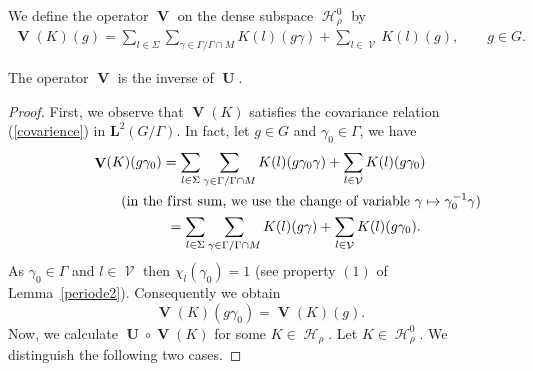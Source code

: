 \documentclass[pdftex]{sigma}
\DeclareMathOperator{\U}{\mathbf{U}}
\DeclareMathOperator{\V}{\mathbf{V}} \DeclareMathOperator{\Aut}{Aut}
\DeclareMathOperator{\nongen}{\mathcal{V}}
\DeclareMathOperator{\Hi}{\mathscr{H}}
\begin{document}
We def\/ine the  operator $\V$  on the dense subspace $ \Hi_\rho^0 $
by
\begin{gather*}
\V(K)(g) =  \sum_{l\in \Sigma} \sum_{\gamma\in \Gamma/\Gamma\cap
M} K(l)(g\gamma)+ \sum _{l\in \nongen} K(l)(g),\qquad g\in G.
\end{gather*}

\begin{proposition}
The operator $\V$ is the inverse of $\U$.
\end{proposition}
\begin{proof}
First, we observe that $\V(K)$ satisf\/ies  the covariance relation
(\ref{covarience}) in $\mathbf{L}^2(G/\Gamma)$. In fact, let $g\in
G$ and $\gamma_0\in \Gamma$, we have
\begin{gather*}
\V(K)(g\gamma_0)   =  \sum_{l\in \Sigma} \sum_{\gamma\in
\Gamma/\Gamma\cap M} K(l)(g\gamma_0\gamma)+ \sum _{l\in
\nongen} K(l)(g\gamma_0)\\
\phantom{\V(K)(g\gamma_0)   =}{}   (\mbox{in the f\/irst sum, we use the  change of variable  }
\gamma\mapsto \gamma_0^{-1}\gamma)\\
\phantom{\V(K)(g\gamma_0)}{}  =  \sum_{l\in \Sigma} \sum_{\gamma\in \Gamma/\Gamma\cap M}
K(l)(g\gamma)+ \sum _{l\in \nongen} K(l)(g\gamma_0).
\end{gather*}
 As $\gamma_0\in \Gamma$ and $l\in \nongen$ then
 $\chi_l(\gamma_0)=1$ (see property $(1)$ of Lemma~\ref{periode2}).
 Consequently we obtain
\[
\V(K)(g\gamma_0)=\V(K)(g).
\]
 Now, we calculate $\U\circ \V (K)$
for some $K\in  \Hi_\rho$.
  Let $K\in \Hi_\rho^0$. We distinguish the following two cases.


\end{proof}
\end{document}

